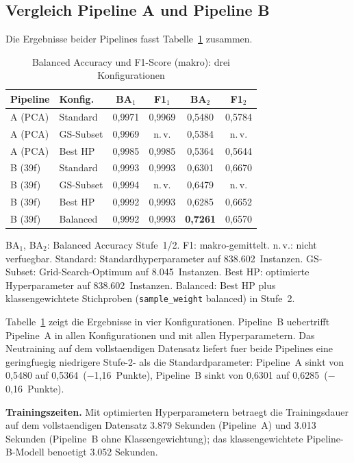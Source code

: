 \subsection{Vergleich Pipeline A und Pipeline B}

Die Ergebnisse beider Pipelines fasst Tabelle~\ref{tab:ergebnisse} zusammen.

\begin{table}[h]
\centering
\caption{Balanced Accuracy und F1-Score (makro): drei Konfigurationen}
\label{tab:ergebnisse}
\begin{tabular}{llcccc}
\toprule
Pipeline & Konfig. & BA$_1$ & F1$_1$ & BA$_2$ & F1$_2$ \\
\midrule
A (PCA) & Standard & 0{,}9971 & 0{,}9969 & 0{,}5480 & 0{,}5784 \\
A (PCA) & GS-Subset & 0{,}9969 & n.\,v. & 0{,}5384 & n.\,v. \\
A (PCA) & Best HP & 0{,}9985 & 0{,}9985 & 0{,}5364 & 0{,}5644 \\
\midrule
B (39f) & Standard & 0{,}9993 & 0{,}9993 & 0{,}6301 & 0{,}6670 \\
B (39f) & GS-Subset & 0{,}9994 & n.\,v. & 0{,}6479 & n.\,v. \\
B (39f) & Best HP & 0{,}9992 & 0{,}9993 & 0{,}6285 & 0{,}6652 \\
B (39f) & Balanced & 0{,}9992 & 0{,}9993 & \textbf{0{,}7261} & 0{,}6570 \\
\bottomrule
\end{tabular}
\smallskip\newline
{\footnotesize BA$_1$, BA$_2$: Balanced Accuracy Stufe~1/2. F1: makro-gemittelt.
n.\,v.: nicht verfuegbar. Standard: Standardhyperparameter auf 838.602~Instanzen. GS-Subset:
Grid-Search-Optimum auf 8.045~Instanzen. Best HP: optimierte Hyperparameter auf
838.602~Instanzen. Balanced: Best HP plus klassengewichtete Stichproben
(\texttt{sample\_weight} balanced) in Stufe~2.}
\end{table}

Tabelle~\ref{tab:ergebnisse} zeigt die Ergebnisse in vier Konfigurationen.
Pipeline~B uebertrifft Pipeline~A in allen Konfigurationen und mit allen Hyperparametern.
Das Neutraining auf dem vollstaendigen Datensatz liefert fuer beide Pipelines eine
geringfuegig niedrigere Stufe-2-\ba{} als die Standardparameter:
Pipeline~A sinkt von 0{,}5480 auf 0{,}5364~($-$1{,}16~Punkte),
Pipeline~B sinkt von 0{,}6301 auf 0{,}6285~($-$0{,}16~Punkte).

\textbf{Trainingszeiten.}
Mit optimierten Hyperparametern betraegt die Trainingsdauer auf dem vollstaendigen Datensatz
3.879 Sekunden (Pipeline~A) und 3.013 Sekunden (Pipeline~B ohne Klassengewichtung); das
klassengewichtete Pipeline-B-Modell benoetigt 3.052 Sekunden.

